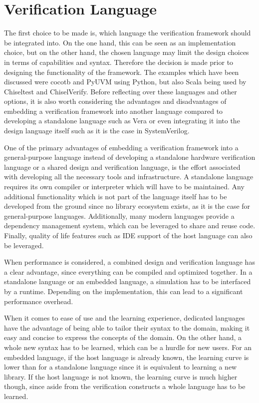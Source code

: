 \section{Verification Language} %

The first choice to be made is, which language the verification framework should be integrated into. On the one hand,
this can be seen as an implementation choice, but on the other hand, the chosen language may limit the design choices
in terms of capabilities and syntax. Therefore the decision is made prior to designing the functionality of the
framework. The examples
which have been discussed were cocotb and PyUVM using Python, but also Scala being used by Chiseltest and
ChiselVerify. Before reflecting over these languages and other options, it is also worth considering the advantages
and disadvantages of embedding a verification framework into another language compared to developing a standalone
language such as Vera or even integrating it into the design language itself such as it is the case in SystemVerilog.

One of the primary advantages of embedding a verification framework into a general-purpose language instead of
developing a standalone hardware verification language or a shared design and verification language, is the effort
associated with developing all the necessary tools and infrastructure. A standalone language requires its own
compiler or interpreter which will have to be maintained. Any additional functionality which is not part of the
language itself has to be developed from the ground since no library ecosystem exists, as it is the case for
general-purpose languages. Additionally, many modern languages provide a dependency management system, which can be
leveraged to share and reuse code. Finally, quality of life features such as IDE support of the host language can
also be leveraged.

When performance is considered, a combined design and verification language has a clear advantage, since everything
can be compiled and optimized together. In a standalone language or an embedded language, a simulation has to be
interfaced by a runtime. Depending on the implementation, this can lead to a significant performance overhead.

When it comes to ease of use and the learning experience, dedicated languages have the advantage of being able to
tailor their syntax to the domain, making it easy and concise to express the concepts of the domain. On the other
hand, a whole new syntax has to be learned, which can be a hurdle for new users. For an embedded language, if the
host language is already known, the learning curve is lower than for a standalone language since it is equivalent to
learning a new library. If the host language is not known, the learning curve is much higher though, since aside from
the verification constructs a whole language has to be learned.

